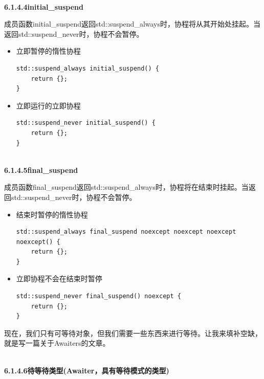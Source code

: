 \hspace*{\fill} \\ %
\noindent
\textbf{6.1.4.4\hspace{0.2cm}initial\_suspend}

成员函数initial\_suspend返回std::suspend\_always时，协程将从其开始处挂起。当返回std::suspend\_never时，协程不会暂停。

\begin{itemize}
\item 
立即暂停的惰性协程

\begin{lstlisting}[style=styleCXX]
std::suspend_always initial_suspend() {
	return {};
}
\end{lstlisting}

\item 
立即运行的立即协程

\begin{lstlisting}[style=styleCXX]
std::suspend_never initial_suspend() {
	return {};
}
\end{lstlisting}
\end{itemize}


\hspace*{\fill} \\ %
\noindent
\textbf{6.1.4.5\hspace{0.2cm}final\_suspend}

成员函数final\_suspend返回std::suspend\_always时，协程将在结束时挂起。当返回std::suspend\_never时，协程不会暂停。

\begin{itemize}
\item 
结束时暂停的惰性协程

\begin{lstlisting}[style=styleCXX]
std::suspend_always final_suspend noexcept noexcept noexcept noexcept() {
	return {};
}
\end{lstlisting}

\item 
立即协程不会在结束时暂停

\begin{lstlisting}[style=styleCXX]
std::suspend_never final_suspend() noexcept {
	return {};
}
\end{lstlisting}
\end{itemize}

现在，我们只有可等待对象，但我们需要一些东西来进行等待。让我来填补空缺，就是写一篇关于Awaiters的文章。

\hspace*{\fill} \\ %
\noindent
\textbf{6.1.4.6\hspace{0.2cm}待等待类型(Awaiter，具有等待模式的类型)}

